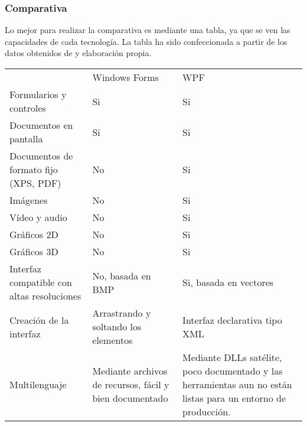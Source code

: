 \subsubsection{Comparativa}
Lo mejor para realizar la comparativa es mediante una tabla, ya que se ven las capacidades de cada tecnolog\'{i}a.
La tabla ha sido confeccionada a partir de los datos obtenidos de \cite{WPFvsWinForms:Comparative} y elaboraci\'{o}n propia.

\begin{table}[H]
    \begin{center}
        \begin{tabular}{|p{5cm} | p{4cm} | p{4cm}|}
            \rowcolor{darkgray}                         & \color{white}Windows Forms               & \color{white}WPF \\
            Formularios y controles                     & Si                                       & Si \\
            Documentos en pantalla                      & Si                                       & Si \\
            Documentos de formato fijo (XPS, PDF)       & No                                       & Si \\
            Im\'{a}genes                                & No                                       & Si \\
            V\'{i}deo y audio                           & No                                       & Si \\
            Gr\'{a}ficos 2D                             & No                                       & Si \\
            Gr\'{a}ficos 3D                             & No                                       & Si \\
            Interfaz compatible con altas resoluciones  & No, basada en BMP                        & Si, basada en vectores \\
            Creaci\'{o}n de la interfaz                 & Arrastrando y soltando los elementos     & Interfaz declarativa tipo XML \\
            Multilenguaje                               & Mediante archivos de recursos, f\'{a}cil y bien documentado & Mediante DLLs sat\'{e}lite, poco documentado y las herramientas aun no est\'{a}n listas para un entorno de producci\'{o}n. \\
            \hline
        \end{tabular}
    \end{center}
\end{table}


